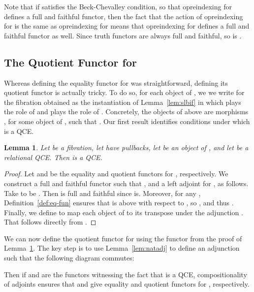 \documentclass{LMCS}
\theoremstyle{plain}
\newtheorem{lemma}[theorem]{Lemma}
\theoremstyle{remark}
\theoremstyle{definition}
\begin{document}
Note that if  satisfies the Beck-Chevalley condition, so that
opreindexing for  defines a full and faithful functor, then the
fact that the action of opreindexing for  is the same as
opreindexing for  means that opreindexing for  defines a full
and faithful functor as well.
Since truth functors are always full and
  faithful, so is .

\subsection{The Quotient Functor for }

Whereas defining the equality functor for  was straightforward,
defining its quotient functor is actually tricky.  To do so, for each
object  of , we we write 
for the fibration obtained as the instantiation of
Lemma~\ref{lem:slbif} in which  plays the role of
 and  plays the role of . Concretely, the objects of
 above  are morphisms , for some object  of , such that . Our first result identifies conditions under which  is a
QCE.

\begin{lemma}\label{lem:lift-qce}
  Let  be a fibration, let  have pullbacks, let 
  be an object of , and let  be a
  relational QCE. Then  is a QCE.
\end{lemma}
\begin{proof}
  Let  and  be the equality
  and quotient functors for , respectively. We construct a full and
  faithful functor  such that , and a left adjoint  for , as
  follows. Take  to be . Then  is full and faithful since
   is. Moreover, for any ,
  Definition~\ref{def:eq-fun} ensures that  is above  with respect to , so , and thus
  . Finally, we define  to map each
  object  of  to its transpose
   under the adjunction . That  follows directly from .
\end{proof}

We can now define the quotient functor for  using the
functor  from the proof of Lemma~\ref{lem:lift-qce}. The key step
is to use Lemma~\ref{lem:natadj} to define an adjunction  such that the following diagram commutes:
 

\vspace*{0.1in}

\noindent
Then if  and  are the functors witnessing the fact that
 is a QCE, compositionality of adjoints ensures that
 and  give equality and quotient functors for
, respectively.

\vspace*{0.1in}
\end{document}
